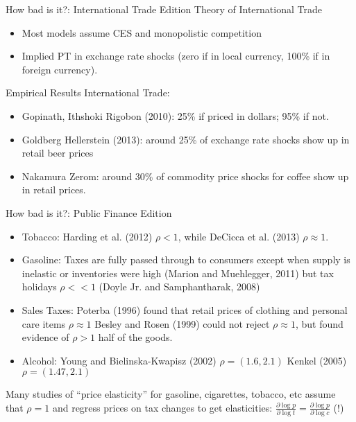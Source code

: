 \begin{frame}{How bad is it?: International Trade Edition}
Theory of International Trade
\begin{itemize}
\item Most models assume CES and monopolistic competition
\item Implied PT in exchange rate shocks (zero if in local currency, 100\% if in foreign currency).
\end{itemize}

Empirical Results International Trade:
\begin{itemize}
\item Gopinath, Ithshoki Rigobon (2010): 25\% if priced in dollars; 95\% if not.
\item Goldberg Hellerstein (2013): around 25\% of exchange rate shocks show up in retail beer prices
\item Nakamura Zerom: around 30\% of commodity price shocks for coffee show up in retail prices.
\end{itemize}
\end{frame}

\begin{frame}{How bad is it?: Public Finance Edition}
\begin{itemize}
\item Tobacco: Harding et al. (2012) $\rho < 1$, while DeCicca et al. (2013) $\rho \approx 1$.
\item Gasoline: Taxes are fully passed through to consumers except when supply is inelastic or inventories were high (Marion and Muehlegger, 2011) but tax holidays $\rho << 1$ (Doyle Jr. and Samphantharak, 2008)
\item Sales Taxes: Poterba (1996) found that retail prices of clothing and personal care items $\rho \approx 1$ Besley and Rosen (1999) could not reject $\rho \approx 1$, but found evidence of $\rho >1$ half of the goods.
\item Alcohol:  Young and Bielinska-Kwapisz (2002) $\rho = (1.6,2.1)$ Kenkel (2005) $\rho=(1.47,2.1)$
\end{itemize}
Many studies of ``price elasticity'' for gasoline, cigarettes, tobacco, etc assume that $\rho=1$ and regress prices on tax changes to get elasticities: $\frac{\partial \log p}{\partial \log t} = \frac{\partial \log p}{\partial \log c}$ (!)
\end{frame}




